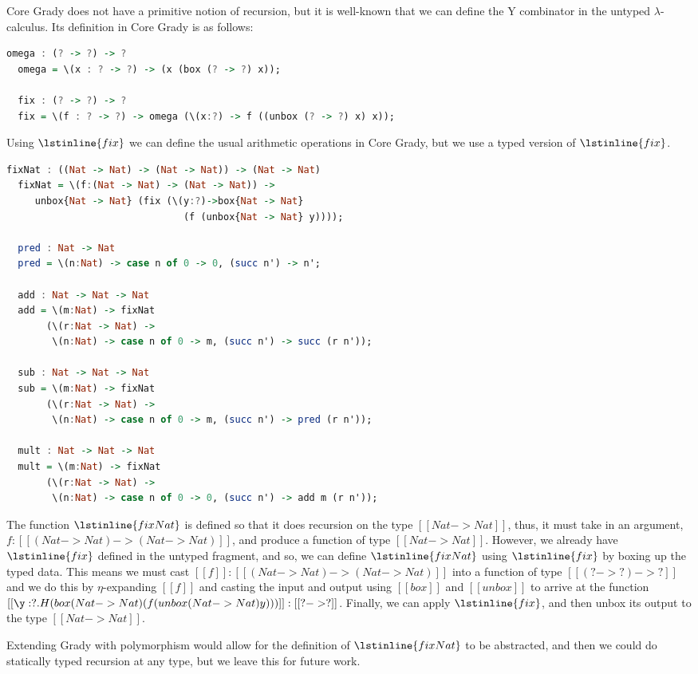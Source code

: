Core Grady does not have a primitive notion of recursion, but it is
well-known that we can define the Y combinator in the untyped
$\lambda$-calculus.  Its definition in Core Grady is as follows:
\begin{lstlisting}[language=Haskell]
  omega : (? -> ?) -> ?
  omega = \(x : ? -> ?) -> (x (box (? -> ?) x));
  
  fix : (? -> ?) -> ?
  fix = \(f : ? -> ?) -> omega (\(x:?) -> f ((unbox (? -> ?) x) x));
\end{lstlisting}
Using $\lstinline{fix}$ we can define the usual arithmetic operations
in Core Grady, but we use a typed version of $\lstinline{fix}$.
\begin{lstlisting}[language=Haskell]
  fixNat : ((Nat -> Nat) -> (Nat -> Nat)) -> (Nat -> Nat)
  fixNat = \(f:(Nat -> Nat) -> (Nat -> Nat)) ->
     unbox{Nat -> Nat} (fix (\(y:?)->box{Nat -> Nat} 
                               (f (unbox{Nat -> Nat} y))));

  pred : Nat -> Nat
  pred = \(n:Nat) -> case n of 0 -> 0, (succ n') -> n';

  add : Nat -> Nat -> Nat
  add = \(m:Nat) -> fixNat
       (\(r:Nat -> Nat) ->
        \(n:Nat) -> case n of 0 -> m, (succ n') -> succ (r n'));

  sub : Nat -> Nat -> Nat
  sub = \(m:Nat) -> fixNat
       (\(r:Nat -> Nat) ->
        \(n:Nat) -> case n of 0 -> m, (succ n') -> pred (r n'));        
        
  mult : Nat -> Nat -> Nat
  mult = \(m:Nat) -> fixNat
       (\(r:Nat -> Nat) ->
        \(n:Nat) -> case n of 0 -> 0, (succ n') -> add m (r n'));
\end{lstlisting}
The function $\lstinline{fixNat}$ is defined so that it does recursion
on the type $[[Nat -> Nat]]$, thus, it must take in an argument,
$f : [[(Nat -> Nat) -> (Nat -> Nat)]]$, and
produce a function of type $[[Nat -> Nat]]$.  However, we
already have $\lstinline{fix}$ defined in the untyped fragment, and
so, we can define $\lstinline{fixNat}$ using $\lstinline{fix}$ by
boxing up the typed data.  This means we must cast $[[f]] : [[(Nat -> Nat) -> (Nat -> Nat)]]$ into a function of type
$[[(? -> ?) -> ?]]$ and we do this by $\eta$-expanding
$[[f]]$ and casting the input and output using $[[box]]$ and
$[[unbox]]$ to arrive at the function
$[[\y:?.H(box (Nat -> Nat) (f (unbox (Nat -> Nat) y)))]] : [[? -> ?]]$.  Finally, we can apply $\lstinline{fix}$, and then unbox its output to the type $[[Nat -> Nat]]$.

Extending Grady with polymorphism would allow for the definition of
$\lstinline{fixNat}$ to be abstracted, and then we could do statically
typed recursion at any type, but we leave this for future work.

